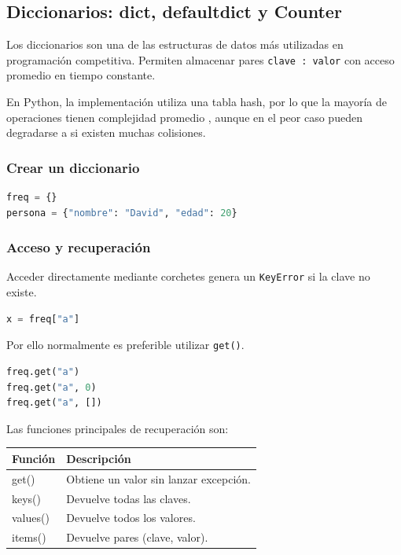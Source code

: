 \subsection{Diccionarios: dict, defaultdict y Counter}
\label{alg:2-3}

Los diccionarios son una de las estructuras de datos más utilizadas en programación competitiva. 
Permiten almacenar pares \texttt{clave : valor} con acceso promedio en tiempo constante.

En Python, la implementación utiliza una tabla hash, por lo que la mayoría de operaciones tienen complejidad promedio
, aunque en el peor caso pueden degradarse a  si existen muchas colisiones.

\vspace{0.3cm}

\subsubsection{Crear un diccionario}

\begin{lstlisting}[language=Python]
freq = {}
persona = {"nombre": "David", "edad": 20}
\end{lstlisting}

\vspace{0.3cm}

\subsubsection{Acceso y recuperación}

Acceder directamente mediante corchetes genera un \texttt{KeyError} si la clave no existe.

\begin{lstlisting}[language=Python]
x = freq["a"]
\end{lstlisting}

Por ello normalmente es preferible utilizar \texttt{get()}.

\begin{lstlisting}[language=Python]
freq.get("a")
freq.get("a", 0)
freq.get("a", [])
\end{lstlisting}

\vspace{0.2cm}

Las funciones principales de recuperación son:

\begin{center}
\begin{tabular}{|l|p{6cm}|}
\hline
Función & Descripción \\ \hline
get() & Obtiene un valor sin lanzar excepción. \\ \hline
keys() & Devuelve todas las claves. \\ \hline
values() & Devuelve todos los valores. \\ \hline
items() & Devuelve pares (clave, valor). \\ \hline
\end{tabular}
\end{center}

